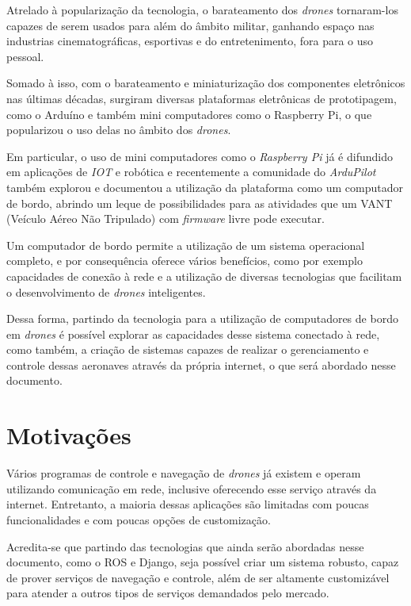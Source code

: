 \documentclass[12pt,a4paper,oneside]{book}
\begin{document}
Atrelado à popularização da tecnologia, o barateamento dos \textit{drones} tornaram-los capazes de serem usados para além do âmbito militar, ganhando espaço nas industrias cinematográficas, esportivas e do entretenimento, fora para o uso pessoal.

Somado à isso, com o barateamento e miniaturização dos componentes eletrônicos nas últimas décadas, surgiram diversas plataformas eletrônicas de prototipagem, como o Arduíno e também mini computadores como o Raspberry Pi, o que popularizou o uso delas no âmbito dos \textit{drones}. 

Em particular, o uso de mini computadores como o \textit{Raspberry Pi} já é difundido em aplicações de \textit{IOT} e robótica e recentemente a comunidade do \textit{ArduPilot} também explorou e documentou a utilização da plataforma como um computador de bordo, abrindo um leque de possibilidades para as atividades que um VANT (Veículo Aéreo Não Tripulado) com \textit{firmware} livre pode executar. 

Um computador de bordo permite a utilização de um sistema operacional completo, e por consequência oferece vários benefícios, como por exemplo capacidades de conexão à rede e a utilização de diversas tecnologias que facilitam o desenvolvimento de \textit{drones} inteligentes.

Dessa forma, partindo da tecnologia para a utilização de computadores de bordo em \textit{drones} é possível explorar as capacidades desse sistema conectado à rede, como também, a criação de sistemas capazes de realizar o gerenciamento e controle dessas aeronaves através da própria internet, o que será abordado nesse documento.

\section{Motivações}

Vários programas de controle e navegação de \textit{drones} já existem e operam utilizando comunicação em rede, inclusive oferecendo esse serviço através da internet. Entretanto, a maioria dessas aplicações são limitadas com poucas funcionalidades e com poucas opções de customização.

Acredita-se que partindo das tecnologias que ainda serão abordadas nesse documento, como o ROS e Django, seja possível criar um sistema robusto, capaz de prover serviços de navegação e controle, além de ser altamente customizável para atender a outros tipos de serviços demandados pelo mercado. 
\end{document}
